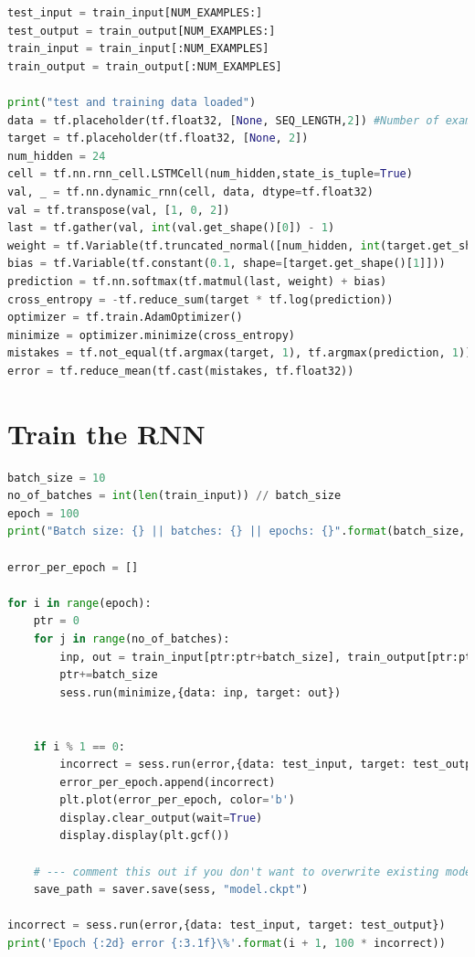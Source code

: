 \documentclass[fancychapters]{report}
\begin{document}
\begin{lstlisting}[language=Python]
test_input = train_input[NUM_EXAMPLES:]
test_output = train_output[NUM_EXAMPLES:]
train_input = train_input[:NUM_EXAMPLES]
train_output = train_output[:NUM_EXAMPLES]

print("test and training data loaded")
data = tf.placeholder(tf.float32, [None, SEQ_LENGTH,2]) #Number of examples, number of input, dimension of each input
target = tf.placeholder(tf.float32, [None, 2])
num_hidden = 24
cell = tf.nn.rnn_cell.LSTMCell(num_hidden,state_is_tuple=True)
val, _ = tf.nn.dynamic_rnn(cell, data, dtype=tf.float32)
val = tf.transpose(val, [1, 0, 2])
last = tf.gather(val, int(val.get_shape()[0]) - 1)
weight = tf.Variable(tf.truncated_normal([num_hidden, int(target.get_shape()[1])]))
bias = tf.Variable(tf.constant(0.1, shape=[target.get_shape()[1]]))
prediction = tf.nn.softmax(tf.matmul(last, weight) + bias)
cross_entropy = -tf.reduce_sum(target * tf.log(prediction))
optimizer = tf.train.AdamOptimizer()
minimize = optimizer.minimize(cross_entropy)
mistakes = tf.not_equal(tf.argmax(target, 1), tf.argmax(prediction, 1))
error = tf.reduce_mean(tf.cast(mistakes, tf.float32))
\end{lstlisting}


\section{Train the RNN}


\begin{lstlisting}[language=Python]
batch_size = 10
no_of_batches = int(len(train_input)) // batch_size
epoch = 100
print("Batch size: {} || batches: {} || epochs: {}".format(batch_size, no_of_batches, epoch))

error_per_epoch = []

for i in range(epoch):
    ptr = 0
    for j in range(no_of_batches):
        inp, out = train_input[ptr:ptr+batch_size], train_output[ptr:ptr+batch_size]
        ptr+=batch_size
        sess.run(minimize,{data: inp, target: out})
    
 
    if i % 1 == 0:
        incorrect = sess.run(error,{data: test_input, target: test_output})
        error_per_epoch.append(incorrect)
        plt.plot(error_per_epoch, color='b')
        display.clear_output(wait=True)
        display.display(plt.gcf())
    
    # --- comment this out if you don't want to overwrite existing model
    save_path = saver.save(sess, "model.ckpt")

incorrect = sess.run(error,{data: test_input, target: test_output})
print('Epoch {:2d} error {:3.1f}\%'.format(i + 1, 100 * incorrect))

\end{lstlisting}
\end{document}
